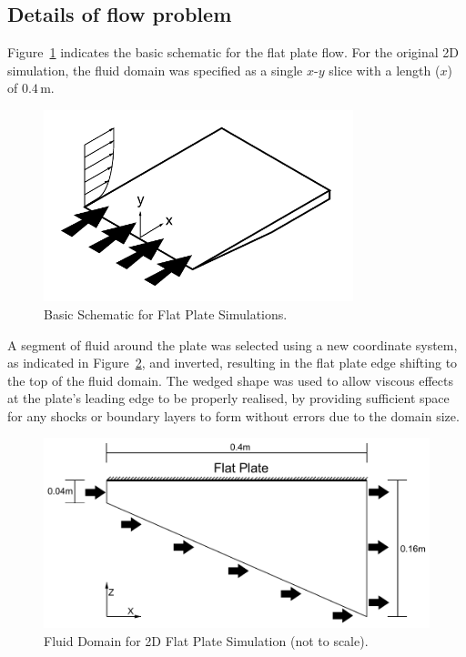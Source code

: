 \subsection{Details of flow problem}
Figure~\ref{f:tc1:scheme} indicates the basic schematic for the flat plate flow. For the original 2D simulation, the fluid domain was specified as a single $x$-$y$ slice with a length ($x$) of $0.4$\,m. 
%
\begin{figure}[htbp]
 \begin{center}
  \includegraphics[width=9cm]{./chap6-3Dflatplate/figs/schematic2.pdf}
  \caption{Basic Schematic for Flat Plate Simulations.}
  \label{f:tc1:scheme}
 \end{center}
\end{figure}
%
A segment of fluid around the plate was selected using a new coordinate system, as indicated in Figure~\ref{f:tc1:fluid}, and inverted, resulting in the flat plate edge shifting to the top of the fluid domain. The wedged shape was used to allow viscous effects at the plate's leading edge to be properly realised, by providing sufficient space for any shocks or boundary layers to form without errors due to the domain size. 
%
\begin{figure}[htbp]
 \begin{center}
  \includegraphics[width=12cm]{./chap6-3Dflatplate/figs/fluidvolume.pdf}
  \caption{Fluid Domain for 2D Flat Plate Simulation (not to scale).}
  \label{f:tc1:fluid}
 \end{center}
\end{figure}
%

